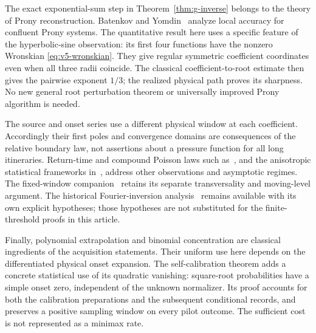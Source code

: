 The exact exponential-sum step in Theorem~\ref{thm:g-inverse} belongs
to the theory of Prony reconstruction. Batenkov and Yomdin~\cite{BYProny}
analyze local accuracy for confluent Prony systems. The quantitative
result here uses a specific feature of the hyperbolic-sine observation:
its first four functions have the nonzero Wronskian
\eqref{eq:v5-wronskian}. They give regular symmetric coefficient
coordinates even when all three radii coincide. The classical
coefficient-to-root estimate then gives the pairwise exponent $1/3$;
the realized physical path proves its sharpness. No new general root
perturbation theorem or universally improved Prony algorithm is needed.

The source and onset series use a different physical window at each
coefficient. Accordingly their first poles and convergence domains are
consequences of the relative boundary law, not assertions about a
pressure function for all long itineraries. Return-time and compound
Poisson laws such as~\cite{Marklof,CNZ}, and the anisotropic statistical
frameworks in~\cite{DMN,DemersZhang}, address other observations and
asymptotic regimes. The fixed-window companion~\cite{TC} retains its
separate transversality and moving-level argument. The historical
Fourier-inversion analysis~\cite{A2R33} remains available with its own
explicit hypotheses; those hypotheses are not substituted for the
finite-threshold proofs in this article.

Finally, polynomial extrapolation and binomial concentration are
classical ingredients of the acquisition statements. Their uniform use
here depends on the differentiated physical onset expansion. The
self-calibration theorem adds a concrete statistical use of its
quadratic vanishing: square-root probabilities have a simple onset
zero, independent of the unknown normalizer. Its proof accounts for
both the calibration preparations and the subsequent conditional
records, and preserves a positive sampling window on every pilot outcome.
The sufficient cost is not represented as a minimax rate.
